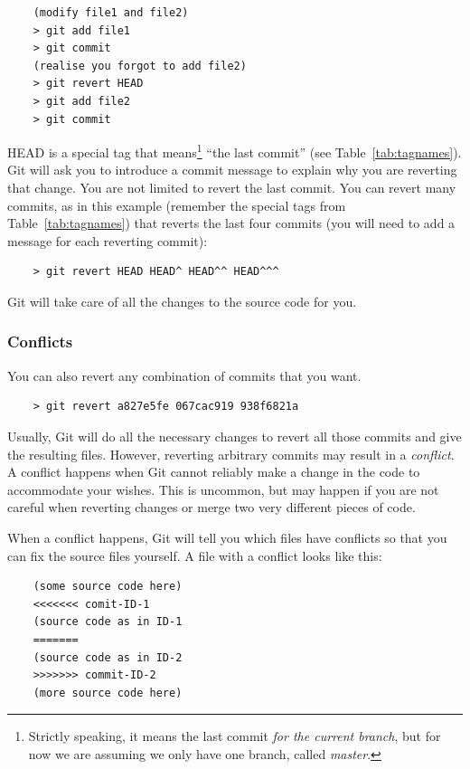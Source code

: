 \begin{verbatim}
    (modify file1 and file2)
    > git add file1
    > git commit 
    (realise you forgot to add file2)
    > git revert HEAD
    > git add file2
    > git commit
\end{verbatim}

HEAD is a special tag that means\footnote{Strictly speaking, it means
  the last commit \emph{for the current branch}, but for now we are
  assuming we only have one branch, called \emph{master}.} ``the last
commit'' (see Table~\ref{tab:tagnames}). Git will ask you 
to introduce a commit message to explain why you are reverting that
change. You are not limited to revert the last commit. You can revert
many commits, as in this example (remember the special tags from
Table~\ref{tab:tagnames}) that reverts the last four commits 
(you will need to add a message for each reverting commit): 

\begin{verbatim}
    > git revert HEAD HEAD^ HEAD^^ HEAD^^^
\end{verbatim}

Git will take care of all the changes to the source code for you. 

\subsubsection{Conflicts}
\label{sec:conflicts}

You can also revert any combination of commits that you want. 

\begin{verbatim}
    > git revert a827e5fe 067cac919 938f6821a
\end{verbatim}

Usually, Git will do all the necessary changes to revert all those
commits and give the resulting files. 
However, reverting arbitrary commits
may result in a \emph{conflict}. A conflict happens when Git
cannot reliably make a change in the code to accommodate your
wishes. This is uncommon, but may happen if you are not careful when
reverting changes or merge two very different pieces of code. 

When a conflict happens, Git will tell you which files have conflicts
so that you can fix the source files yourself. A file with a conflict
looks like this: 

\begin{verbatim}
    (some source code here)
    <<<<<<< comit-ID-1
    (source code as in ID-1
    =======
    (source code as in ID-2
    >>>>>>> commit-ID-2
    (more source code here)
\end{verbatim}

